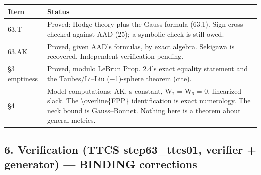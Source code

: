 \documentclass[
  10pt,
]{report}
\begin{document}
\begin{longtable}[]{@{}ll@{}}
\toprule
\begin{minipage}[b]{0.47\columnwidth}\raggedright
Item\strut
\end{minipage} & \begin{minipage}[b]{0.47\columnwidth}\raggedright
Status\strut
\end{minipage}\tabularnewline
\midrule
\endhead
\begin{minipage}[t]{0.47\columnwidth}\raggedright
63.T\strut
\end{minipage} & \begin{minipage}[t]{0.47\columnwidth}\raggedright
Proved: Hodge theory plus the Gauss formula (63.1). Sign cross-checked
against AAD (25); a symbolic check is still owed.\strut
\end{minipage}\tabularnewline
\begin{minipage}[t]{0.47\columnwidth}\raggedright
63.AK\strut
\end{minipage} & \begin{minipage}[t]{0.47\columnwidth}\raggedright
Proved, given AAD's formulas, by exact algebra. Sekigawa is recovered.
Independent verification pending.\strut
\end{minipage}\tabularnewline
\begin{minipage}[t]{0.47\columnwidth}\raggedright
§3 emptiness\strut
\end{minipage} & \begin{minipage}[t]{0.47\columnwidth}\raggedright
Proved, modulo LeBrun Prop. 2.4's exact equality statement and the
Taubes/Li--Liu (−1)-sphere theorem (cite).\strut
\end{minipage}\tabularnewline
\begin{minipage}[t]{0.47\columnwidth}\raggedright
§4\strut
\end{minipage} & \begin{minipage}[t]{0.47\columnwidth}\raggedright
Model computations: AK, s constant, W₂ = W₃ = 0, linearized slack. The
\textbackslash overline\{FPP\} identification is exact numerology. The
neck bound is Gauss--Bonnet. Nothing here is a theorem about general
metrics.\strut
\end{minipage}\tabularnewline
\bottomrule
\end{longtable}

\hypertarget{verification-ttcs-step63_ttcs01-verifier-generator-binding-corrections}{%
\subsection{6. Verification (TTCS step63\_ttcs01, verifier + generator)
--- BINDING
corrections}\label{verification-ttcs-step63_ttcs01-verifier-generator-binding-corrections}}
\end{document}
